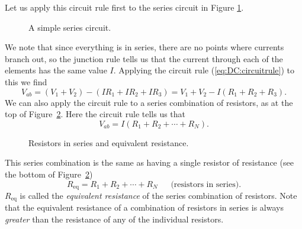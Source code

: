 Let us apply this circuit rule first to the series circuit in Figure 
\ref{fig:DC:series1}.  
\begin{figure}[htb]
\centerline{\epsfxsize=12cm }
\caption{A simple series circuit.}
\label{fig:DC:series1}
\end{figure}
We note that since everything is in series, there are no points where currents
branch out, so the junction rule tells us that the current through each of 
the elements has the same value $I$.  Applying the circuit rule 
(\ref{eq:DC:circuitrule}) to this we find
$$
V_{ab} = (V_1+V_2) - ( IR_1 + IR_2 + IR_3) = V_1+V_2 - I (R_1 + R_2 + R_3).
$$
We can also apply the circuit rule to a series combination of resistors, as
at the top of Figure~\ref{fig:DC:resistseries}.
Here the circuit rule tells us that
$$
V_{ab} = I (R_1+R_2+\cdots+R_N).
$$
\begin{figure}[htb]
\centerline{\epsfxsize=10cm }
\caption{Resistors in series and equivalent resistance.}
\label{fig:DC:resistseries}
\end{figure}
This series combination is the same as having a single resistor of resistance
(see the bottom of Figure~\ref{fig:DC:resistseries})
$$
R_{\mbox{eq}}=R_1+R_2+\cdots+R_N ~~~~~~~\mbox{(resistors in series)}.
$$
$R_{\mbox{eq}}$ is called the {\it equivalent resistance} of the series 
combination of resistors.  Note that the equivalent resistance of a combination
of resistors in series is always {\it greater} than the resistance of any of 
the individual resistors.

